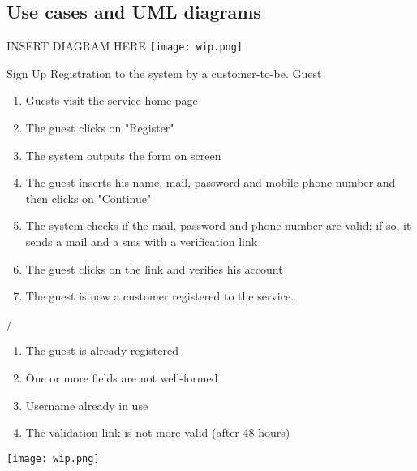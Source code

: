 
\pagebreak
\subsection{Use cases and UML diagrams}
INSERT DIAGRAM HERE
\texttt{[image: wip.png]}
\pagebreak

\usecase
{Sign Up}
{Registration to the system by a customer-to-be.}
{Guest}
{
\begin{enumerate}
	\item Guests visit the service home page
	\item The guest clicks on "Register"
	\item The system outputs the form on screen
	\item The guest inserts his name, mail, password and mobile phone number and then clicks on "Continue"
	\item The system checks if the mail, password and phone number are valid; if so, it sends a mail and a sms with a verification link
	\item The guest clicks on the link and verifies his account
	\item The guest is now a customer registered to the service. 
\end{enumerate}
}
{
/
}
{ 
\begin{enumerate}
	\item The guest is already registered
	\item One or more fields are not well-formed
	\item Username already in use
    \item The validation link is not more valid (after 48 hours)
\end{enumerate}
}

\pagebreak
\texttt{[image: wip.png]}

